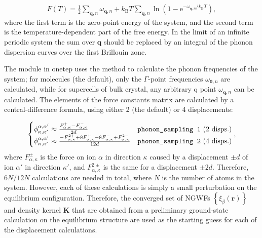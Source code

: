 \documentclass[letterpaper,10pt,english]{sphinxmanual}
\begin{document}
\label{\detokenize{phonons:equation-free-energy}}\begin{equation}\label{equation:phonons:free_energy}
\begin{split}F \left ( T \right ) = \frac{1}{2} \sum_{\mathbf{q},n} \omega_{\mathbf{q},n} + k_\mathrm{B} T \sum_{\mathbf{q},n} \ln{\left ( 1-\mathrm{e}^{-\omega_{\mathbf{q},n}/k_\mathrm{B} T} \right )},\end{split}
\end{equation}
where the first term is the zero-point energy of the system, and the
second term is the temperature-dependent part of the free energy. In the
limit of an infinite periodic system the sum over \(\mathbf{q}\)
should be replaced by an integral of the phonon dispersion curves over
the first Brillouin zone.

The  module in onetep uses the  method to
calculate the phonon frequencies of the system; for molecules (the
default), only the \(\Gamma\)-point frequencies
\(\omega_{\mathbf{0},n}\) are calculated, while for supercells of
bulk crystal, any arbitrary q point \(\omega_{\mathbf{q},n}\) can be
calculated. The elements of the force constants matrix are calculated by
a central-difference formula, using either 2 (the default) or 4
displacements:

\label{\detokenize{phonons:equation-fd}}\begin{equation}\label{equation:phonons:fd}
\begin{split}\begin{cases}
\phi_{\kappa,\kappa'}^{\alpha,\alpha'} \approx \frac{F_{\alpha,\kappa}^+ - F_{\alpha,\kappa}^-}{2d} & \text{\texttt{phonon\_sampling 1} (2 disps.)} \\
\phi_{\kappa,\kappa'}^{\alpha,\alpha'} \approx \frac{- F_{\alpha,\kappa}^{2+} + 8 F_{\alpha,\kappa}^+ - 8 F_{\alpha,\kappa}^- + F_{\alpha,\kappa}^{2-}}{12d} & \text{\texttt{phonon\_sampling 2} (4 disps.)}
\end{cases},\end{split}
\end{equation}
where \(F_{\alpha,\kappa}^\pm\) is the force on ion \(\alpha\)
in direction \(\kappa\) caused by a displacement \(\pm d\) of
ion \(\alpha'\) in direction \(\kappa'\), and
\(F_{\alpha,\kappa}^{2\pm}\) is the same for a displacement
\(\pm 2d\). Therefore, \(6N\)/\(12N\) calculations are
needed in total, where \(N\) is the number of atoms in the system.
However, each of these calculations is simply a small perturbation on
the equilibrium configuration. Therefore, the converged set of NGWFs
\(\left \{ \xi_\beta \left ( \mathbf{r} \right ) \right \}\) and
density kernel \(\mathbf{K}\) that are obtained from a preliminary
ground-state calculation on the equilibrium structure are used as the
starting guess for each of the displacement calculations.
\end{document}
